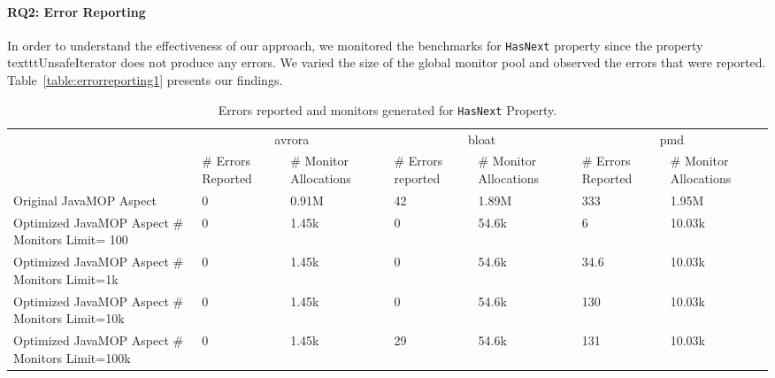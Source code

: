 \paragraph{RQ2: Error Reporting}

In order to understand the effectiveness of our approach, we monitored the 
benchmarks for \texttt{HasNext} property since the property 
texttt{UnsafeIterator} does not produce
any errors. We varied the size of the global monitor pool and observed the 
errors that were reported. Table~\ref{table:errorreporting1} presents our 
findings.



\begin{table*}[!ht]
\centering
\begin{tabular}{|p{3.7cm}|p{1.2cm}|p{1.5cm}|p{1.2cm}|p{1.5cm}|p{1.2cm}|p{1.5cm}|
}
\hline
\multirow{2}{*}{}               & \multicolumn{2}{c|}{avrora}             & 
\multicolumn{2}{c|}{bloat}            & \multicolumn{2}{c|}{pmd}              \\ 
\cline{2-7} 
                                       & \# Errors Reported  & \# Monitor 
Allocations & \# Errors reported & \# Monitor Allocations& \# Errors Reported & 
\# Monitor Allocations\\ \hline
Original JavaMOP Aspect                                                    & 0   
           & 0.91M         & 42          & 1.89M            & 333               
& 1.95M     \\ \hline
Optimized JavaMOP Aspect  \# Monitors Limit= 100            & 0             & 
1.45k           & 0            & 54.6k              & 6                  & 
10.03k       \\ \hline
Optimized JavaMOP Aspect  \# Monitors Limit=1k           & 0             & 1.45k 
          & 0            & 54.6k             & 34.6              & 10.03k       
\\ \hline
Optimized JavaMOP Aspect  \# Monitors Limit=10k        & 0             & 1.45k   
        & 0            & 54.6k             & 130               & 10.03k       \\ 
\hline
Optimized JavaMOP Aspect  \# Monitors Limit=100k      & 0             & 1.45k    
       & 29          & 54.6k             & 131               & 10.03k       \\ 
\hline
\end{tabular}
\caption{Errors reported and monitors generated for \texttt{HasNext} Property.}
\end{table*}
\label{table:errorreporting1}

